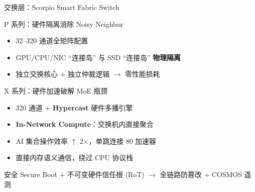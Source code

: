 \documentclass[aspectratio=169, 10pt, UTF8]{ctexbeamer}
\begin{document}
\begin{frame}{交换层：Scorpio Smart Fabric Switch}
  \begin{block}{P 系列：硬件隔离消除 Noisy Neighbor}
    \begin{itemize}
      \item 32--320 通道全矩阵配置
      \item GPU/CPU/NIC ``连接岛'' 与 SSD ``连接岛'' \textbf{物理隔离}
      \item 独立交换核心 + 独立仲裁逻辑 $\to$ 零性能损耗
    \end{itemize}
  \end{block}

  \begin{exampleblock}{X 系列：硬件加速破解 MoE 瓶颈}
    \begin{itemize}
      \item 320 通道 + \textbf{Hypercast} 硬件多播引擎
      \item \textbf{In-Network Compute}：交换机内直接聚合
      \item AI 集合操作效率 $\uparrow$ 2$\times$，单跳连接 80 加速器
      \item 直接内存语义通信，绕过 CPU 协议栈
    \end{itemize}
  \end{exampleblock}

  \begin{alertblock}{安全}
    Secure Boot + 不可变硬件信任根 (RoT) $\to$ 全链路防篡改 + COSMOS 遥测
  \end{alertblock}
\end{frame}
\end{document}
